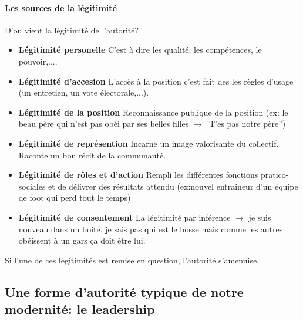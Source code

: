 \documentclass[11pt]{article} %
\begin{document}
\paragraph{Les sources de la légitimité} 

D'ou vient la légitimité de l'autorité? 

\begin{itemize}

 \item \textbf{Légitimité personelle} C'est à dire les qualité, les
compétences, le pouvoir,....

 \item \textbf{Légitimité d'accesion} L'accès à la position c'est fait des
 les règles d'usage (un entretien, un vote électorale,...).

 \item \textbf{Légitimité de la position} Reconnaissance publique de la
 position (ex: le beau père qui n'est pas obéi par ses belles filles
 $\to$ 'T'es pas notre père'')

 \item \textbf{Légitimité de représention} Incarne un image valorisante du
 collectif. Raconte un bon récit de la communauté.

 \item \textbf{Légitimité de rôles et d'action} Rempli les différentes
 fonctions pratico-sociales et de délivrer des résultats attendu
 (ex:nouvel entraineur d'un équipe de foot qui perd tout le temps)

 \item \textbf{Légitimité de consentement} La légitimité par inférence
 $\to$ je suis nouveau dans un boite, je sais pas qui est le bosse mais
 comme les autres obéissent à un gars ça doit être lui.

\end{itemize}

Si l'une de ces légitimités est remise en question, l'autorité
s'amenuise.

\subsection{Une forme d'autorité typique de notre modernité: le leadership}
\end{document}
